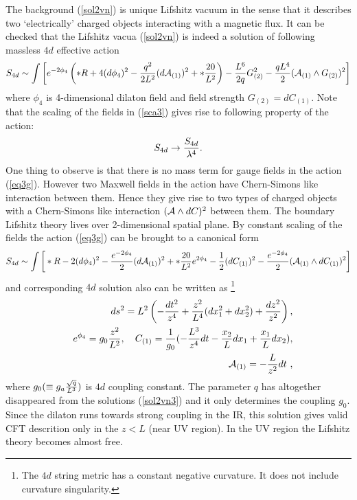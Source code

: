 \documentclass[12pt]{article}
\def\be{\begin{equation}} \def\ee{\end{equation}}
\def\bea{\begin{eqnarray}} \def\eea{\end{eqnarray}} \def\ba{\begin{array}}
\newcommand{\eqn}[1]{(\ref{#1})}
\def\br{\nonumber\\}
\begin{document}
The background \eqn{sol2vn} is  unique Lifshitz vacuum in the sense that
it describes two `electrically'  charged objects 
interacting with a magnetic flux. 
It can be checked  that the Lifshitz 
vacua \eqn{sol2vn} is indeed a solution of following massless 
$4d$ effective action 
\bea\label{eq3g}
S_{4d}\sim \int \bigg[ e^{-2\phi_4}\left( \ast R +4(d\phi_4)^2
-{q^2\over 2L^2}(d{\cal{A}}_{(1)})^2 +\ast {20\over L^2}\right)  
-{L^6\over 2q} G_{(2)}^2 - {qL^4\over 2} ({\cal{A}}_{(1)}\wedge G_{(2)})^2  
\bigg] \br 
\eea
where $\phi_4$ is 4-dimensional dilaton field and
field strength $G_{(2)}=dC_{(1)}$.  Note that 
the scaling of the  fields 
 in \eqn{sca3} gives rise to following  property 
of the action: 
\be
S_{4d}\to {S_{4d} \over \lambda^4} .
\ee
One thing to observe is that 
there is no mass term for gauge fields in the action \eqn{eq3g}. However
two Maxwell  fields in the action have Chern-Simons like interaction
between them. 
Hence  they give rise to two types of  charged objects with a Chern-Simons 
like interaction  $( {\cal{A}}\wedge dC)^2$ between them. 
The boundary Lifshitz  theory  lives over 2-dimensional spatial plane. 
By  constant  scaling of the  fields the action \eqn{eq3g} 
can be brought to a canonical form
\bea\label{eq3g1}
S_{4d}\sim \int \bigg[ \ast R -2(d\phi_4)^2
-{ e^{-2\phi_4}\over 2}(d{\cal{A}}_{(1)})^2 +\ast {20\over L^2}  e^{2\phi_4}  
-{1\over 2} (dC_{(1)})^2 - { e^{-2\phi_4}\over 2} 
({\cal{A}}_{(1)}\wedge dC_{(1)})^2  
\bigg] \br 
\eea
and corresponding $4d$ solution also can be written as 
\footnote{ The $4d$ string metric has a constant negative curvature. It does not include curvature singularity.}  
\bea\label{sol2vn3}
&&ds^2=L^2\left(- {dt^2\over  z^4} +{z^2\over L^4}(dx_1^2+dx_2^2)+{dz^2\over
z^2} \right)    ,\br
&&e^{\phi_4}=g_0{z^2\over L^2}, ~~~
C_{(1)}= {1\over g_0}(-{L^3\over z^4}  dt - {x_2\over L} dx_1 +{x_1\over L}dx_2),  \br 
&& {\cal{A}}_{(1)}=  -{L\over  z^2}dt  \ ,
\eea
where $g_0(\equiv g_a{\sqrt{q}\over L^3})$ is $4d$ coupling constant.
The parameter $q$  has altogether disappeared from  the 
solutions \eqn{sol2vn3} and it only determines the  coupling $g_0$. 
Since the dilaton runs towards strong coupling in the IR, this solution gives
valid CFT descrition only in the $z< L$ (near UV region). In the UV region the 
Lifshitz theory becomes almost free.
\end{document}
